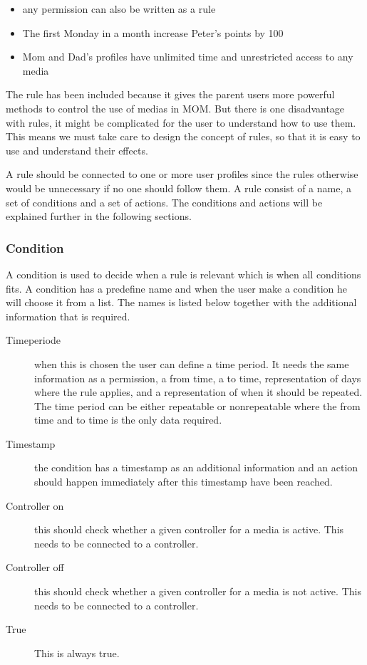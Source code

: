 \begin{itemize}
	\item any permission can also be written as a rule
	\item The first Monday in a month increase Peter's points by 100
	\item Mom and Dad's profiles have unlimited time and unrestricted access to any media
\end{itemize}

The rule has been included because it gives the parent users more powerful methods to control the use of medias in MOM. %
But there is one disadvantage with rules, it might be complicated for the user to understand how to use them. 
This means we must take care to design the concept of rules, so that it is easy to use and understand their effects.

A rule should be connected to one or more user profiles since the rules otherwise would be unnecessary if no one should follow them. A rule consist of a name, a set of conditions and a set of actions. The conditions and actions will be explained further in the following sections.
	
\subsubsection{Condition}
A condition is used to decide when a rule is relevant which is when all conditions fits. A condition has a predefine name and when the user make a condition he will choose it from a list. The names is listed below together with the additional information that is required. 

\begin{description}
	\item[Timeperiode] when this is chosen the user can define a time period. It needs the same information as a permission, a from time, a to time, representation of days where the rule applies, and a representation of when it should be repeated. The time period can be either repeatable or nonrepeatable where the from time and to time is the only data required.
	\item[Timestamp] the condition has a timestamp as an additional information and an action should happen immediately after this timestamp have been reached. 
	\item[Controller on] this should check whether a given controller for a media is active. This needs to be connected to a controller.
	\item[Controller off] this should check whether a given controller for a media is not active. This needs to be connected to a controller.
	\item[True] This is always true.
\end{description}

